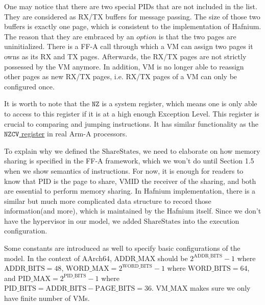 \documentclass[a4paper]{article}
\newcommand*{\SSS}{\text{ShareStates}}
\newcommand*{\PID}{\text{PID}}
\newcommand*{\VMID}{\text{VMID}}
\newcommand*{\PABITS}{\text{ADDR\_BITS}}
\newcommand*{\PPBITS}{\text{PAGE\_BITS}}
\newcommand*{\PPIDBITS}{\text{PID\_BITS}}
\newcommand*{\PAMAX}{\text{ADDR\_MAX}}
\newcommand*{\PPIDMAX}{\text{PID\_MAX}}
\newcommand*{\PWBITS}{\text{WORD\_BITS}}
\newcommand*{\PWMAX}{\text{WORD\_MAX}}
\newcommand*{\PVMMAX}{\text{VM\_MAX}}
\begin{document}
One may notice that there are two special $\PID$s that are not included in the
list. They are considered as RX/TX buffers for message passing. The size of
those two buffers is exactly one page, which is consistent to the
implementation of Hafnium. The reason that they are embraced by an $option$ is
that the two pages are uninitialized. There is a FF-A call through which a VM
can assign two pages it owns as its RX and TX pages. Afterwards, the RX/TX pages
are not strictly possessed by the VM anymore. In addition, VM is no longer able to
reassign other pages as new RX/TX pages, i.e. RX/TX pages of a VM can only be
configured once.

It is worth to note that the $\mathtt{NZ}$ is a system register, which means one
is only able to access to this register if it is at a high enough Exception
Level. This register is crucial to comparing and jumping instructions. It has
similar functionality as the
\href{https://developer.arm.com/docs/ddi0595/h/aarch64-system-registers/nzcv}
{$\mathtt{NZCV}$ register} in real Arm-A processors.

To explain why we defined the $\SSS$, we need to elaborate on how memory sharing is
specified in the FF-A framework, which we won't do until Section 1.5 when we
show semantics of instructions. For now, it is enough for readers to know that $\PID$ is
the page to share, $\VMID$ the receiver of the sharing, and both are essential
to perform memory sharing. In Hafnium implementation, there is a similar but
much more complicated data structure to record those information(and more),
which is maintained by the Hafnium itself. Since we don't have the hypervisor in
our model, we added $\SSS$ into the execution configuration.

Some constants are introduced as well to specify basic configurations of the model. In
the context of AArch64, $\PAMAX$ should be $2^{\PABITS} - 1$ where
$\PABITS = 48$, $\PWMAX = 2^{\PWBITS} -1$ where $\PWBITS = 64$, and
$\PPIDMAX = 2^{\PPIDBITS}-1$ where $\PPIDBITS = \PABITS - \PPBITS = 36$.
$\PVMMAX$ makes sure we only have finite number of VMs.
\end{document}
